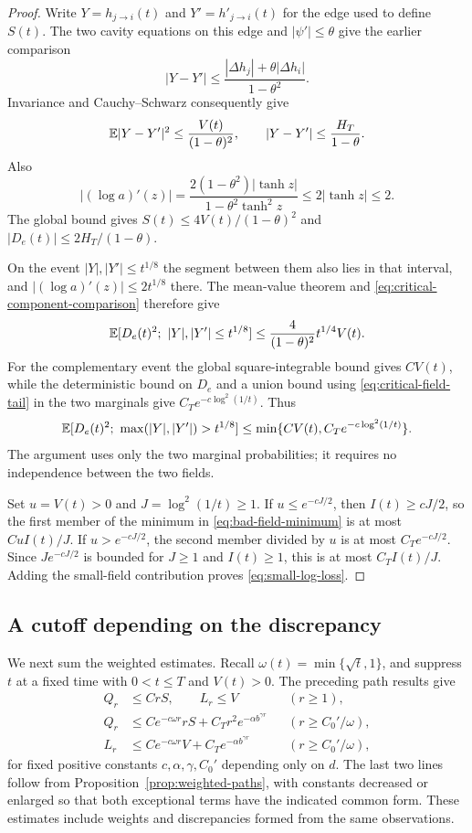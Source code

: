 \begin{proof}
Write $Y=h_{j\to i}(t)$ and $Y'=h'_{j\to i}(t)$ for the edge used to
define $S(t)$.  The two cavity equations on this edge and
$|\psi'|\le\theta$ give the earlier comparison
\[
 |Y-Y'|\le\frac{|\Delta h_j|+\theta|\Delta h_i|}{1-\theta^2}.
\]
Invariance and Cauchy--Schwarz consequently give
\begin{equation}
 \mathbb E|Y-Y'|^2\le\frac{V(t)}{(1-\theta)^2},
 \qquad |Y-Y'|\le\frac{H_T}{1-\theta}.
 \label{eq:critical-component-comparison}
\end{equation}
Also
\[
 |(\log a)'(z)|
 =\frac{2(1-\theta^2)|\tanh z|}{1-\theta^2\tanh^2z}
 \le2|\tanh z|\le2.
\]
The global bound gives $S(t)\le4V(t)/(1-\theta)^2$ and
$|D_e(t)|\le2H_T/(1-\theta)$.

On the event $|Y|,|Y'|\le t^{1/8}$ the segment between them also lies
in that interval, and $|(\log a)'(z)|\le2t^{1/8}$ there.
The mean-value theorem and \eqref{eq:critical-component-comparison}
therefore give
\[
 \mathbb E[D_e(t)^2;\ |Y|,|Y'|\le t^{1/8}]
 \le\frac{4}{(1-\theta)^2}t^{1/4}V(t).
\]
For the complementary event the global square-integrable bound gives
$CV(t)$, while the deterministic bound on $D_e$ and a union bound
using \eqref{eq:critical-field-tail} in the two marginals give
$C_Te^{-c\log^2(1/t)}$.  Thus
\begin{equation}
 \E[D_e(t)^2;\ \max(|Y|,|Y'|)>t^{1/8}]
 \le\min\{CV(t),C_Te^{-c\log^2(1/t)}\}.
 \label{eq:bad-field-minimum}
\end{equation}
The argument uses only the two marginal probabilities; it requires
no independence between the two fields.

Set $u=V(t)>0$ and $J=\log^2(1/t)\ge1$.  If $u\le e^{-cJ/2}$,
then $I(t)\ge cJ/2$, so the first member of the minimum in
\eqref{eq:bad-field-minimum} is at most $C u I(t)/J$.
If $u>e^{-cJ/2}$, the second member divided by $u$ is at most
$C_Te^{-cJ/2}$.  Since $J e^{-cJ/2}$ is bounded for $J\ge1$
and $I(t)\ge1$, this is at most $C_T I(t)/J$.
Adding the small-field contribution proves \eqref{eq:small-log-loss}.
\end{proof}

\subsection{A cutoff depending on the discrepancy}

We next sum the weighted estimates.  Recall
$\omega(t)=\min\{\sqrt t,1\}$, and suppress $t$ at a fixed time
with $0<t\le T$ and $V(t)>0$.  The preceding path results give
\begin{align*}
 Q_r&\le C rS,\qquad L_r\le V &&(r\ge1),\\
 Q_r&\le C e^{-c\omega r}rS+C_T r^2e^{-\alpha b^{\gamma r}}
 &&(r\ge C_0'/\omega),\\
 L_r&\le C e^{-c\omega r}V+C_T e^{-\alpha b^{\gamma r}}
 &&(r\ge C_0'/\omega),
\end{align*}
for fixed positive constants $c,\alpha,\gamma,C_0'$ depending only on
$d$.  The last two lines follow from Proposition~\ref{prop:weighted-paths}, with
constants decreased or enlarged so that both exceptional terms have
the indicated common form.  These estimates include weights and
discrepancies formed from the same observations.

